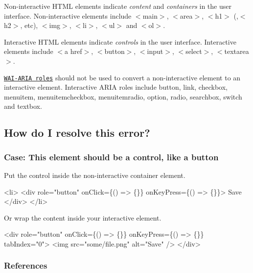 Non-\/interactive H\+T\+ML elements indicate {\itshape content} and {\itshape containers} in the user interface. Non-\/interactive elements include {\ttfamily $<$main$>$}, {\ttfamily $<$area$>$}, {\ttfamily $<$h1$>$} (,{\ttfamily $<$h2$>$}, etc), {\ttfamily $<$img$>$}, {\ttfamily $<$li$>$}, {\ttfamily $<$ul$>$} and {\ttfamily $<$ol$>$}.

Interactive H\+T\+ML elements indicate {\itshape controls} in the user interface. Interactive elements include {\ttfamily $<$a href$>$}, {\ttfamily $<$button$>$}, {\ttfamily $<$input$>$}, {\ttfamily $<$select$>$}, {\ttfamily $<$textarea$>$}.

\href{https://www.w3.org/TR/wai-aria-1.1/#usage_intro}{\tt W\+A\+I-\/\+A\+R\+IA roles} should not be used to convert a non-\/interactive element to an interactive element. Interactive A\+R\+IA roles include {\ttfamily button}, {\ttfamily link}, {\ttfamily checkbox}, {\ttfamily menuitem}, {\ttfamily menuitemcheckbox}, {\ttfamily menuitemradio}, {\ttfamily option}, {\ttfamily radio}, {\ttfamily searchbox}, {\ttfamily switch} and {\ttfamily textbox}.

\subsection*{How do I resolve this error?}

\subsubsection*{Case\+: This element should be a control, like a button}

Put the control inside the non-\/interactive container element.


\begin{DoxyCode}
<li>
  <div
    role="button"
    onClick=\{() => \{\}\}
    onKeyPress=\{() => \{\}\}>
    Save
  </div>
</li>
\end{DoxyCode}


Or wrap the content inside your interactive element.


\begin{DoxyCode}
<div
  role="button"
  onClick=\{() => \{\}\}
  onKeyPress=\{() => \{\}\}
  tabIndex="0">
  <img src="some/file.png" alt="Save" />
</div>
\end{DoxyCode}


\subsubsection*{References}


